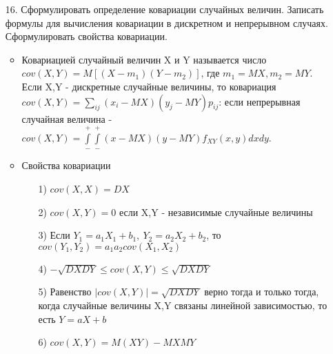\documentclass[a4paper]{article}
\begin{document}
\begin{enumerate}
\item[16.] Сформулировать определение ковариации случайных величин. Записать формулы для вычисления ковариации в дискретном и непрерывном случаях. Сформулировать свойства ковариации.
\begin{itemize}
\item Ковариацией случайный величин X и Y называется число $cov(X,Y) = M \left[ (X - m_1)(Y - m_2) \right]$, где $m_1 = MX, m_2 = MY$. \\
Если X,Y - дискретные случайные величины, то ковариация $cov(X,Y) = \sum\limits_{ij} (x_i - MX)(y_j - MY) p_{ij}$: если непрерывная случайная величина - $\displaystyle  cov(X,Y) = \int\limits_{-}^{+} \int\limits_{-}^{+} (x - MX)(y - MY) f_{XY}(x,y) dxdy$.
\item Свойства ковариации 
	\begin{enumerate}
	\item[1)] $cov(X,X) = DX$
	\item[2)] $cov(X,Y) = 0$ если X,Y - независимые случайные величины
	\item[3)] Если $Y_1 = a_1 X_1 + b_1, \ Y_2 = a_2 X_2 + b_2$, то $cov(Y_1, Y_2) = a_1 a_2 cov(X_1, X_2)$
	\item[4)] $-\sqrt{DXDY} \leqslant cov(X,Y) \leqslant \sqrt{DXDY}$
	\item[5)] Равенство $\left|cov(X,Y)\right| = \sqrt{DXDY}$ верно тогда и только тогда, когда случайные величины X,Y связаны линейной зависимостью, то есть $Y = aX + b$
	\item[6)] $cov(X,Y) = M(XY) - MXMY$
	\end{enumerate}
\end{itemize}

\end{enumerate}
\end{document}
